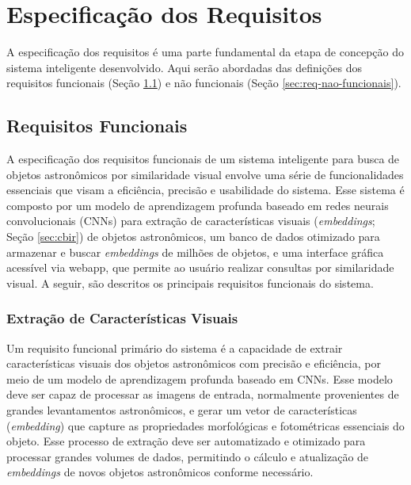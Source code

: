 \section{Especificação dos Requisitos}
\label{cap:req}

A especificação dos requisitos é uma parte fundamental da etapa de concepção do sistema inteligente desenvolvido. Aqui serão abordadas das definições dos requisitos funcionais (Seção \ref{sec:req-funcionais}) e não funcionais (Seção \ref{sec:req-nao-funcionais}).





\subsection{Requisitos Funcionais}
\label{sec:req-funcionais}

A especificação dos requisitos funcionais de um sistema inteligente para busca de objetos astronômicos por similaridade visual envolve uma série de funcionalidades essenciais que visam a eficiência, precisão e usabilidade do sistema. Esse sistema é composto por um modelo de aprendizagem profunda baseado em redes neurais convolucionais (CNNs) para extração de características visuais (\emph{embeddings}; Seção \ref{sec:cbir}) de objetos astronômicos, um banco de dados otimizado para armazenar e buscar \emph{embeddings} de milhões de objetos, e uma interface gráfica acessível via webapp, que permite ao usuário realizar consultas por similaridade visual. A seguir, são descritos os principais requisitos funcionais do sistema.






\subsubsection{Extração de Características Visuais}
\label{sec:req-embeddings}

Um requisito funcional primário do sistema é a capacidade de extrair características visuais dos objetos astronômicos com precisão e eficiência, por meio de um modelo de aprendizagem profunda baseado em CNNs. Esse modelo deve ser capaz de processar as imagens de entrada, normalmente provenientes de grandes levantamentos astronômicos, e gerar um vetor de características (\emph{embedding}) que capture as propriedades morfológicas e fotométricas essenciais do objeto. Esse processo de extração deve ser automatizado e otimizado para processar grandes volumes de dados, permitindo o cálculo e atualização de \emph{embeddings} de novos objetos astronômicos conforme necessário.






